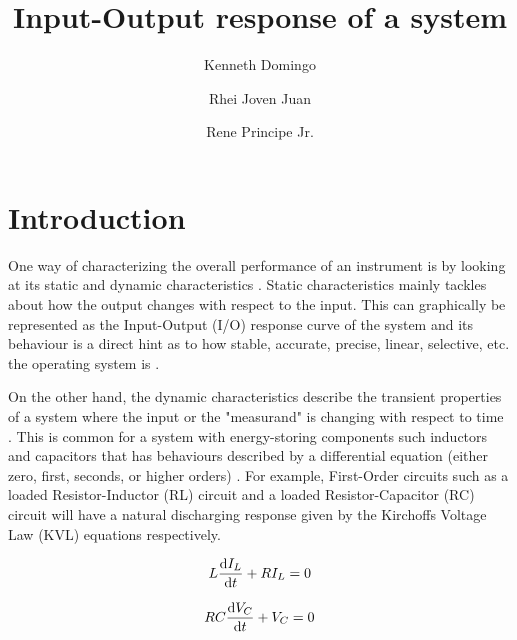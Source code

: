 \documentclass[12pt,a4paper,twoside]{article}
\begin{document}
\title{\TitleFont Input-Output response of a system
}

\author[ ]{Kenneth Domingo\authorsep}
\author[ ]{Rhei Joven Juan\authorsep}
\author[ ]{Rene Principe Jr.\lastauthorsep}

\begin{abstract}
\noindent


\keywords{}

\end{abstract}

\maketitle
\thispagestyle{titlestyle}

\section{Introduction}
\label{sec:Intro}

One way of characterizing the overall performance of an instrument is by looking at its static and dynamic characteristics \cite{IDC}. Static characteristics mainly tackles about how the output changes with respect to the input. This can graphically be represented as the Input-Output (I/O) response curve of the system and its behaviour is a direct hint as to how stable, accurate, precise, linear, selective, etc. the operating system is \cite{Sensors}.

On the other hand, the dynamic characteristics describe the transient properties of a system where the input or the "measurand" is changing with respect to time \cite{Sensors}. This is common for a system with energy-storing components such inductors and capacitors  that has behaviours described by a differential equation (either zero, first, seconds, or higher orders) \cite{Sensors}. For example, First-Order circuits such as a loaded Resistor-Inductor (RL) circuit and a loaded Resistor-Capacitor (RC) circuit will have a natural discharging response given by the Kirchoffs Voltage Law (KVL) equations respectively.

\begin{equation}\label{eq:kvl-rl}
    L\dv{I_L}{t} + RI_L = 0
\end{equation}

\begin{equation}\label{eq:kvl-rc}
    RC\dv{V_C}{t} + V_C = 0
\end{equation}
\end{document}
